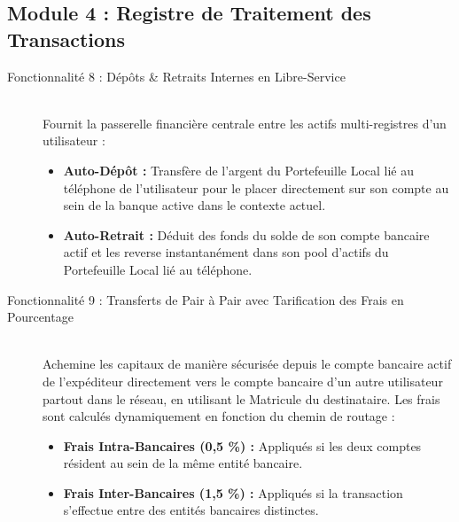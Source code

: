 \documentclass[12pt,a4paper]{article}
\begin{document}
	\subsection{Module 4 : Registre de Traitement des Transactions}
	\begin{description}
		\item[Fonctionnalité 8 : Dépôts \& Retraits Internes en Libre-Service] ~\\
		Fournit la passerelle financière centrale entre les actifs multi-registres d'un utilisateur :
		\begin{itemize}
			\item \textbf{Auto-Dépôt :} Transfère de l'argent du Portefeuille Local lié au téléphone de l'utilisateur pour le placer directement sur son compte au sein de la banque active dans le contexte actuel.
			\item \textbf{Auto-Retrait :} Déduit des fonds du solde de son compte bancaire actif et les reverse instantanément dans son pool d'actifs du Portefeuille Local lié au téléphone.
		\end{itemize}
		
		\item[Fonctionnalité 9 : Transferts de Pair à Pair avec Tarification des Frais en Pourcentage] ~\\
		Achemine les capitaux de manière sécurisée depuis le compte bancaire actif de l'expéditeur directement vers le compte bancaire d'un autre utilisateur partout dans le réseau, en utilisant le Matricule du destinataire. Les frais sont calculés dynamiquement en fonction du chemin de routage :
		\begin{itemize}
			\item \textbf{Frais Intra-Bancaires (0,5 \%) :} Appliqués si les deux comptes résident au sein de la même entité bancaire.
			\item \textbf{Frais Inter-Bancaires (1,5 \%) :} Appliqués si la transaction s'effectue entre des entités bancaires distinctes.
		\end{itemize}
	\end{description}
	
\end{document}
